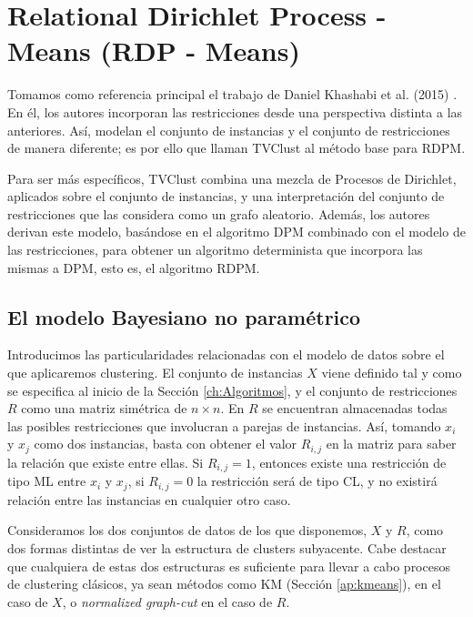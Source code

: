 \section{Relational Dirichlet Process - Means (RDP - Means)} \label{rdpmYtvc}

Tomamos como referencia principal el trabajo de Daniel Khashabi et al. (2015) \cite{RDPM:2015}. En él, los autores incorporan las restricciones desde una perspectiva distinta a las anteriores. Así, modelan el conjunto de instancias y el conjunto de restricciones de manera diferente; es por ello que llaman \acf{TVClust} al método base para \acf{RDPM}.

Para ser más específicos, \acs{TVClust} combina una mezcla de Procesos de Dirichlet, aplicados sobre el conjunto de instancias, y una interpretación del conjunto de restricciones que las considera como un grafo aleatorio. Además, los autores derivan este modelo, basándose en el algoritmo \acf{DPM} \cite{DPM:2012} combinado con el modelo de las restricciones, para obtener un algoritmo determinista que incorpora las mismas a \acs{DPM}, esto es, el algoritmo \acf{RDPM}.

\subsection{El modelo Bayesiano no paramétrico}

Introducimos las particularidades relacionadas con el modelo de datos sobre el que aplicaremos clustering. El conjunto de instancias $X$ viene definido tal y como se especifica al inicio de la Sección \ref{ch:Algoritmos}, y el conjunto de restricciones $R$ como una matriz simétrica de $n \times n$. En $R$ se encuentran almacenadas todas las posibles restricciones que involucran a parejas de instancias. Así, tomando $x_i$ y $x_j$ como dos instancias, basta con obtener el valor $R_{i,j}$ en la matriz para saber la relación que existe entre ellas. Si $R_{i,j} = 1$, entonces existe una restricción de tipo \acf{ML} entre $x_i$ y $x_j$, si $R_{i,j} = 0$ la restricción será de tipo \acf{CL}, y no existirá relación entre las instancias en cualquier otro caso.

Consideramos los dos conjuntos de datos de los que disponemos, $X$ y $R$, como dos formas distintas de ver la estructura de clusters subyacente. Cabe destacar que cualquiera de estas dos estructuras es suficiente para llevar a cabo procesos de clustering clásicos, ya sean métodos como \acf{KM} (Sección \ref{ap:kmeans}), en el caso de $X$, o \textit{normalized graph-cut} en el caso de $R$.

